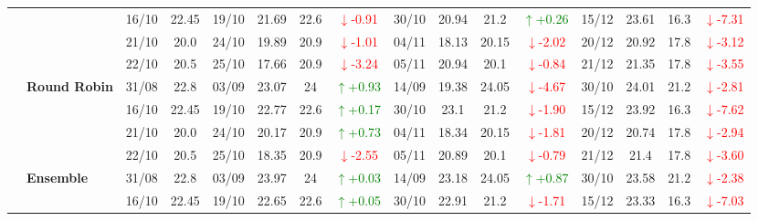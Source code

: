 {\begin{longtable}{llcc|cccc|cccc|cccc}
& 
& 16/10 & 22.45 & 19/10 & 21.69 & 22.6 & \textcolor{red}{\(\downarrow\)-0.91} & 30/10 & 20.94 & 21.2 & \textcolor{green}{\(\uparrow\)+0.26} & 15/12 & 23.61 & 16.3 & \textcolor{red}{\(\downarrow\)-7.31} \\

& 
& 21/10 & 20.0 & 24/10 & 19.89 & 20.9 & \textcolor{red}{\(\downarrow\)-1.01} & 04/11 & 18.13 & 20.15 & \textcolor{red}{\(\downarrow\)-2.02} & 20/12 & 20.92 & 17.8 & \textcolor{red}{\(\downarrow\)-3.12} \\

&
& 22/10 & 20.5 & 25/10 & 17.66 & 20.9 & \textcolor{red}{\(\downarrow\)-3.24} & 05/11 & 20.94 & 20.1 & \textcolor{red}{\(\downarrow\)-0.84} & 21/12 & 21.35 & 17.8 & \textcolor{red}{\(\downarrow\)-3.55} \\
\cmidrule(lr){2-16}


& \textbf{Round Robin}
& 31/08 & 22.8 & 03/09 & 23.07 & 24 & \textcolor{green}{\(\uparrow\)+0.93} & 14/09 & 19.38 & 24.05 & \textcolor{red}{\(\downarrow\)-4.67} & 30/10 & 24.01 & 21.2 & \textcolor{red}{\(\downarrow\)-2.81} \\

&
& 16/10 & 22.45 & 19/10 & 22.77 & 22.6 & \textcolor{green}{\(\uparrow\)+0.17} & 30/10 & 23.1 & 21.2 & \textcolor{red}{\(\downarrow\)-1.90} & 15/12 & 23.92 & 16.3 & \textcolor{red}{\(\downarrow\)-7.62} \\

&
& 21/10 & 20.0 & 24/10 & 20.17 & 20.9 & \textcolor{green}{\(\uparrow\)+0.73} & 04/11 & 18.34 & 20.15 & \textcolor{red}{\(\downarrow\)-1.81} & 20/12 & 20.74 & 17.8 & \textcolor{red}{\(\downarrow\)-2.94} \\

&
& 22/10 & 20.5 & 25/10 & 18.35 & 20.9 & \textcolor{red}{\(\downarrow\)-2.55} & 05/11 & 20.89 & 20.1 & \textcolor{red}{\(\downarrow\)-0.79} & 21/12 & 21.4 & 17.8 & \textcolor{red}{\(\downarrow\)-3.60} \\
\cmidrule(lr){2-16}


& \textbf{Ensemble}
& 31/08 & 22.8 & 03/09 & 23.97 & 24 & \textcolor{green}{\(\uparrow\)+0.03} & 14/09 & 23.18 & 24.05 & \textcolor{green}{\(\uparrow\)+0.87} & 30/10 & 23.58 & 21.2 & \textcolor{red}{\(\downarrow\)-2.38} \\

&
& 16/10 & 22.45 & 19/10 & 22.65 & 22.6 & \textcolor{green}{\(\uparrow\)+0.05} & 30/10 & 22.91 & 21.2 & \textcolor{red}{\(\downarrow\)-1.71} & 15/12 & 23.33 & 16.3 & \textcolor{red}{\(\downarrow\)-7.03} \\


\end{longtable}}
